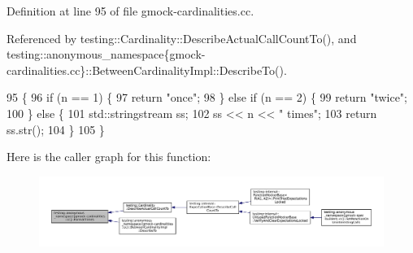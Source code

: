 Definition at line 95 of file gmock-\/cardinalities.\+cc.



Referenced by testing\+::\+Cardinality\+::\+Describe\+Actual\+Call\+Count\+To(), and testing\+::anonymous\+\_\+namespace\{gmock-\/cardinalities.\+cc\}\+::\+Between\+Cardinality\+Impl\+::\+Describe\+To().


\begin{DoxyCode}
95                                          \{
96   \textcolor{keywordflow}{if} (n == 1) \{
97     \textcolor{keywordflow}{return} \textcolor{stringliteral}{"once"};
98   \} \textcolor{keywordflow}{else} \textcolor{keywordflow}{if} (n == 2) \{
99     \textcolor{keywordflow}{return} \textcolor{stringliteral}{"twice"};
100   \} \textcolor{keywordflow}{else} \{
101     std::stringstream ss;
102     ss << n << \textcolor{stringliteral}{" times"};
103     \textcolor{keywordflow}{return} ss.str();
104   \}
105 \}
\end{DoxyCode}
Here is the caller graph for this function\+:
\nopagebreak
\begin{figure}[H]
\begin{center}
\leavevmode
\includegraphics[width=350pt]{namespacetesting_1_1anonymous__namespace_02gmock-cardinalities_8cc_03_a96225757688584c7c21d9a120bc74fd4_icgraph}
\end{center}
\end{figure}
